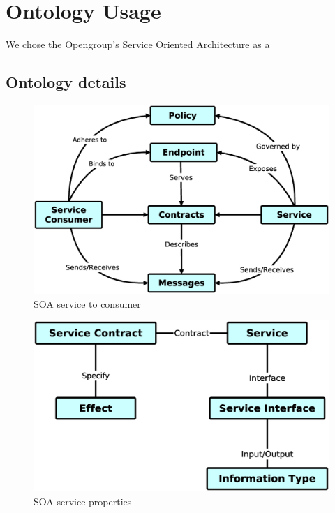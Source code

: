 
\section{Ontology Usage}

We chose the Opengroup's Service Oriented Architecture as a 

\subsection{Ontology details}

\begin{figure}[!h]
\centering
\includegraphics[scale=.2]{img/soa_relation.eps}
\caption{SOA service to consumer}
\label{fig:cm}
\end{figure}




\begin{figure}[!h]
\centering
\includegraphics[scale=.2]{img/soa_property.eps}
\caption{SOA service properties}
\label{fig:cm}
\end{figure}

